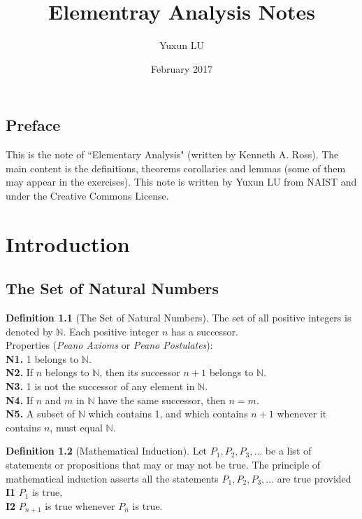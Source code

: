 \documentclass{book}
\title{Elementray Analysis Notes}
\author{Yuxun LU}
\date{February 2017}
\theoremstyle{definition}
\newtheorem{definition}{Definition}[section]
\begin{document}
\maketitle
\section*{Preface}
This is the note of ``Elementary Analysis" (written by Kenneth A. Ross). The main content is the definitions, theorems corollaries and lemmas (some of them may appear in the exercises). This note is written by Yuxun LU from NAIST and under the Creative Commons License.
\tableofcontents
\mainmatter
\chapter{Introduction}
\section{The Set of Natural Numbers}

\begin{definition}[The Set of Natural Numbers]
The set of all positive integers is denoted by $\mathbb{N}$. Each positive integer $n$ has a successor.
\\ Properties (\textit{Peano Axioms} or \textit{Peano Postulates}):
\\ \textbf{N1.} 1 belongs to $\mathbb{N}$.
\\ \textbf{N2.} If $n$ belongs to $\mathbb{N}$, then its successor $n+1$ belongs to $\mathbb{N}$.
\\ \textbf{N3.} 1 is not the successor of any element in $\mathbb{N}$.
\\ \textbf{N4.} If $n$ and $m$ in $\mathbb{N}$ have the same successor, then $n=m$.
\\ \textbf{N5.} A subset of $\mathbb{N}$ which contains 1, and which contains $n+1$ whenever it contains $n$, must equal $\mathbb{N}$.
\end{definition}
\begin{definition}[Mathematical Induction]
Let $P_1, P_2, P_3, ...$ be a list of statements or propositions that may or may not be true. The principle of mathematical induction asserts all the statements $P_1, P_2, P_3, ...$ are true provided
\\ \textbf{I1} $P_1$ is true,
\\ \textbf{I2} $P_{n+1}$ is true whenever $P_n$ is true.
\end{definition}
\end{document}
